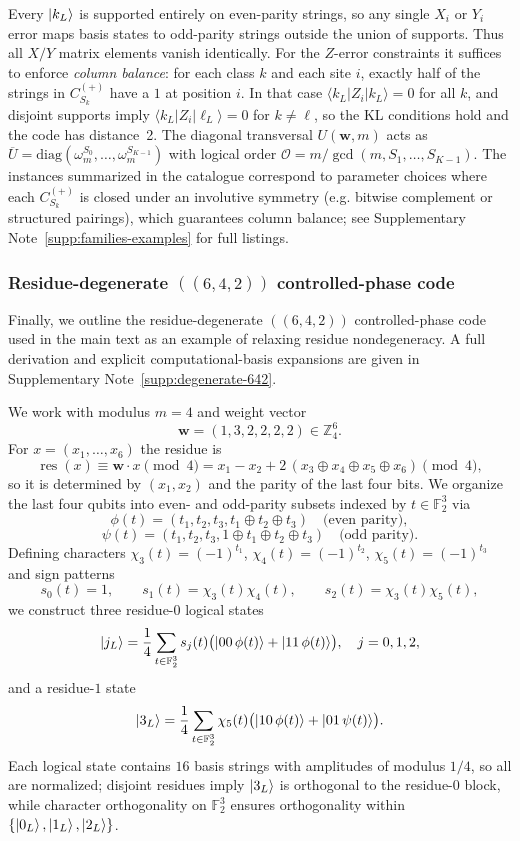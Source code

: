 \documentclass[pdflatex,sn-nature]{sn-jnl}%
\theoremstyle{thmstyleone}%
\theoremstyle{thmstyletwo}%
\theoremstyle{thmstylethree}%
\begin{document}
Every $\ket{k_L}$ is supported entirely on even-parity strings, so any single $X_i$ or $Y_i$ error maps basis states to odd-parity strings outside the union of supports. Thus all $X/Y$ matrix elements vanish identically. For the $Z$-error constraints it suffices to enforce \emph{column balance}: for each class $k$ and each site $i$, exactly half of the strings in $C^{(+)}_{S_k}$ have a $1$ at position $i$. In that case
$\langle k_L|Z_i|k_L\rangle=0$ for all $k$, and disjoint supports imply $\langle k_L|Z_i|\ell_L\rangle=0$ for $k\neq\ell$, so the KL conditions hold and the code has distance~2. The diagonal transversal $U(\mathbf w,m)$ acts as
$\overline U=\mathrm{diag}(\omega_m^{S_0},\dots,\omega_m^{S_{K-1}})$ with logical order
$\mathcal O=m/\gcd(m,S_1,\dots,S_{K-1})$. The instances summarized in the catalogue correspond to parameter choices where each $C^{(+)}_{S_k}$ is closed under an involutive symmetry (e.g. bitwise complement or structured pairings), which guarantees column balance; see Supplementary Note~\ref{supp:families-examples} for full listings.


\subsubsection{Residue-degenerate \texorpdfstring{$((6,4,2))$}{((6,4,2))} controlled-phase code}
\label{subsubsec:proof_642}

Finally, we outline the residue-degenerate $((6,4,2))$ controlled-phase code used in the main text as an example of relaxing residue nondegeneracy. A full derivation and explicit computational-basis expansions are given in Supplementary Note~\ref{supp:degenerate-642}.

We work with modulus $m=4$ and weight vector
\[
  \mathbf w=(1,3,2,2,2,2)\in\mathbb Z_4^6.
\]
For $x=(x_1,\dots,x_6)$ the residue is
\[
  \operatorname{res}(x)\equiv \mathbf w\cdot x \pmod 4
  = x_1 - x_2 + 2\,(x_3\oplus x_4\oplus x_5\oplus x_6)\pmod 4,
\]
so it is determined by $(x_1,x_2)$ and the parity of the last four bits. We organize the last four qubits into even- and odd-parity subsets indexed by $t\in\mathbb F_2^3$ via
\[
  \phi(t)=(t_1,t_2,t_3,t_1\oplus t_2\oplus t_3) \quad\text{(even parity)},
\]
\[
  \psi(t)=(t_1,t_2,t_3,1\oplus t_1\oplus t_2\oplus t_3) \quad\text{(odd parity)}.
\]
Defining characters
$\chi_3(t)=(-1)^{t_1}$, $\chi_4(t)=(-1)^{t_2}$, $\chi_5(t)=(-1)^{t_3}$ and sign patterns
\[
  s_0(t)=1,\qquad s_1(t)=\chi_3(t)\chi_4(t),\qquad s_2(t)=\chi_3(t)\chi_5(t),
\]
we construct three residue-$0$ logical states
\[
  \ket{j_L}
    =\frac{1}{4}\sum_{t\in\mathbb F_2^3} s_j(t)\bigl(\ket{00\,\phi(t)}+\ket{11\,\phi(t)}\bigr),
    \quad j=0,1,2,
\]
and a residue-$1$ state
\[
  \ket{3_L}
    =\frac{1}{4}\sum_{t\in\mathbb F_2^3} \chi_5(t)\bigl(\ket{10\,\phi(t)}+\ket{01\,\psi(t)}\bigr).
\]
Each logical state contains $16$ basis strings with amplitudes of modulus $1/4$, so all are normalized; disjoint residues imply $\ket{3_L}$ is orthogonal to the residue-$0$ block, while character orthogonality on $\mathbb F_2^3$ ensures orthogonality within $\{\ket{0_L},\ket{1_L},\ket{2_L}\}$.
\end{document}
